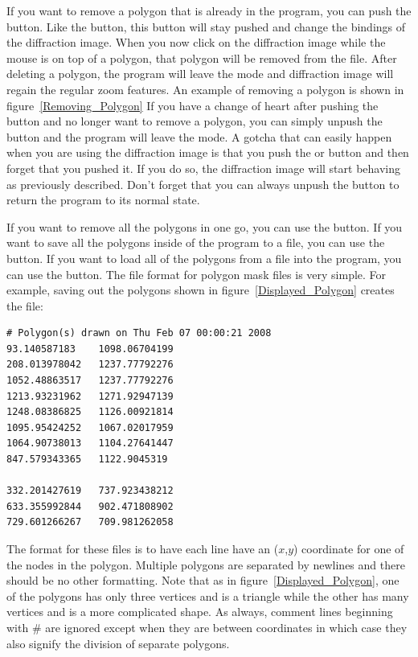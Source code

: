 If you want to remove a polygon that is already in
the program, you can push the 
button. Like the  button, this
button will stay pushed and change the bindings of 
the diffraction image. When you now click on the
diffraction image while the mouse is on top of a
polygon, that polygon will be removed from the file.
After deleting a polygon, the program will leave
the  mode and diffraction 
image will regain the regular zoom features.
An example of removing a polygon is shown
in figure~\ref{Removing_Polygon}
If you have a change of heart after pushing the
 button and no longer want to
remove a polygon, you can simply unpush the button
and the program will leave the 
mode. A gotcha that can easily happen when you are
using the diffraction image is that you push the
 or  button
and then forget that you pushed it. If you do so,
the diffraction image will start behaving as
previously described. Don't forget that you can 
always unpush the button to return the program to
its normal state.

If you want to remove all the polygons in one go,
you can use the  button. If you
want to save all the polygons inside of the 
program to a file, you can use the 
button. If you want to load all of the polygons
from a file into the program, you can use the
 button. The file format for polygon
mask files is very simple. For example, saving
out the polygons shown in figure~\ref{Displayed_Polygon}
creates the file:
\begin{lstlisting}[caption={'A demonstrative polygon mask file'}]
# Polygon(s) drawn on Thu Feb 07 00:00:21 2008
93.140587183	1098.06704199
208.013978042	1237.77792276
1052.48863517	1237.77792276
1213.93231962	1271.92947139
1248.08386825	1126.00921814
1095.95424252	1067.02017959
1064.90738013	1104.27641447
847.579343365	1122.9045319

332.201427619	737.923438212
633.355992844	902.471808902
729.601266267	709.981262058
\end{lstlisting}
The format for these files is to have each line have
an ($x$,$y$) coordinate for one of the nodes in
the polygon. Multiple polygons are separated by
newlines and there should be no other formatting.
Note that as in figure~\ref{Displayed_Polygon},
one of the polygons has only three vertices
and is a triangle while the other has many
vertices and is a more complicated shape.
As always, comment lines beginning with \# are 
ignored except when they are between coordinates
in which case they also signify the division of
separate polygons.

